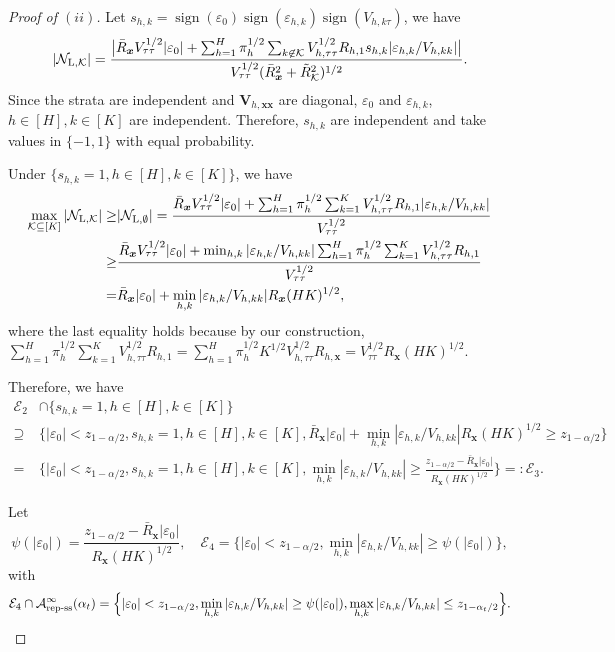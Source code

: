\documentclass[12pt]{article}
\newcommand{\sign}{\operatorname{sign}}
\newcommand{\Lin}{\textnormal{L}}
\newcommand{\mk}{\mathcal{K}}
\newcommand{\ma}{\mathcal{A}}
\newcommand{\repss}{\textnormal{rep-ss}}
\newcommand{\bs}{\boldsymbol}
\newcommand{\vtt}{V_{\tau\tau}}
\begin{document}
\begin{proof}[Proof of  $(ii)$]
 Let $s_{h,k} = \sign(\varepsilon_0)\sign(\varepsilon_{h,k})\sign(V_{h,k \tau})$, we have
\begin{align*}
    |\mathcal{N}_{\Lin, \mk}| =\frac{\big|\bar{R}_{\bs{x}}\vtt^{1/2}|\varepsilon_0|+\sum_{h=1}^H \pi_{h}^{1/2} \sum_{k\not\in \mk}V_{h,\tau\tau}^{1/2}R_{h,1} s_{h,k}|\varepsilon_{h,k}/V_{h,kk}|\big|}{\vtt^{1/2}(\bar{R}_{\bs{x}}^2 + \tilde{R}^2_{\mk})^{1/2}}.
\end{align*}
Since the strata are independent  and $\bs{V}_{h,\bs{x}\bs{x}}$ are diagonal,  $\varepsilon_0$ and $\varepsilon_{h,k}$, $h\in [H], k\in [K]$ are independent. Therefore, $s_{h,k}$ are independent and take values in $\{-1,1\}$ with equal probability. 

Under $\{s_{h,k}=1, h\in [H], k \in [K]\}$, we have
\begin{align*}
    \max_{\mk \subseteq [K]} |\mathcal{N}_{\Lin, \mk}| \geq & |\mathcal{N}_{\Lin, \emptyset}| = \frac{\bar{R}_{\bs{x}}\vtt^{1/2}|\varepsilon_0|+\sum_{h=1}^H \pi_{h}^{1/2} \sum_{k=1}^K V_{h,\tau\tau}^{1/2}R_{h,1} |\varepsilon_{h,k}/V_{h,kk}|}{\vtt^{1/2}}\\
    \geq &  \frac{\bar{R}_{\bs{x}}\vtt^{1/2}|\varepsilon_0|+ \min_{h,k}|\varepsilon_{h,k}/V_{h,kk}| \sum_{h=1}^H \pi_{h}^{1/2} \sum_{k=1}^K V_{h,\tau\tau}^{1/2}R_{h,1} }{\vtt^{1/2}}\\
    = & \bar{R}_{\bs{x}}|\varepsilon_0|+ \min_{h,k}|\varepsilon_{h,k}/V_{h,kk}| R_{\bs{x}} (HK)^{1/2},
\end{align*}
where the last equality holds because by our construction, $\sum_{h=1}^H \pi_{h}^{1/2} \sum_{k=1}^K V_{h,\tau\tau}^{1/2}R_{h,1} = \sum_{h=1}^H \pi_{h}^{1/2} K^{1/2} V_{h,\tau\tau}^{1/2}R_{h,\bs{x}} = V_{\tau\tau}^{1/2}R_{\bs{x}} (HK)^{1/2}.$ 

Therefore, we have
\begin{align*}
 \mathcal{E}_2 &\cap \{s_{h,k}=1, h\in [H], k \in [K]\} \\
\supseteq &  \Big\{|\varepsilon_0| < z_{1-\alpha/2},s_{h,k}=1, h\in [H], k \in [K], \bar{R}_{\bs{x}}|\varepsilon_0|+ \min_{h,k}|\varepsilon_{h,k}/V_{h,kk}| R_{\bs{x}} (HK)^{1/2} \geq z_{1-\alpha/2}\Big\} \\
=  & \Big\{|\varepsilon_0| < z_{1-\alpha/2},s_{h,k}=1, h\in [H], k \in [K],  
\min_{h,k}|\varepsilon_{h,k}/V_{h,kk}|  \geq \frac{z_{1-\alpha/2} - \bar{R}_{\bs{x}}|\varepsilon_0| }{R_{\bs{x}} (HK)^{1/2}} \Big\} =: \mathcal{E}_3.
\end{align*}

Let
\[
\psi(|\varepsilon_0|) = \frac{z_{1-\alpha/2} - \bar{R}_{\bs{x}}|\varepsilon_0| }{R_{\bs{x}} (HK)^{1/2}},\quad  \mathcal{E}_4 = \Big\{|\varepsilon_0| < z_{1-\alpha/2},
\min_{h,k}|\varepsilon_{h,k}/V_{h,kk}|  \geq \psi(|\varepsilon_0|) \Big\},
\]
with 
\[
\mathcal{E}_4 \cap \ma^{\infty}_{\repss}(\alpha_t) = \Big\{|\varepsilon_0| < z_{1-\alpha/2},
\min_{h,k}|\varepsilon_{h,k}/V_{h,kk}|  \geq \psi(|\varepsilon_0|), \max_{h,k}|\varepsilon_{h,k}/V_{h,kk}| \leq z_{1-\alpha_t/2} \Big\}.
\]


\end{proof}
\end{document}
